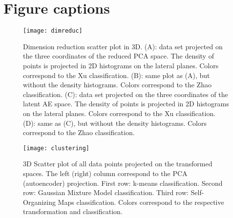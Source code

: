 \documentclass[utf8]{frontiersSCNS} %
\begin{document}
\section*{Figure captions}



\begin{figure}[h!]
	\begin{center}
		\texttt{[image: dimreduc]}%
	\end{center}
	\caption{Dimension reduction scatter plot in 3D. (A): data set projected on the three coordinates of the reduced PCA space. The density of points is projected in 2D histograms on the lateral planes. Colors correspond to the Xu classification. (B): same plot as (A), but without the density histograms. Colors correspond to the Zhao classification. (C): data set projected on the three coordinates of the latent AE space. The density of points is projected in 2D histograms on the lateral planes. Colors correspond to the Xu classification. (D): same as (C), but without the density histograms. Colors correspond to the Zhao classification. }\label{fig:dimreduc}
\end{figure}

\begin{figure}[h!]
	\begin{center}
		\texttt{[image: clustering]}%
	\end{center}
	\caption{3D Scatter plot of all data points projected on the transformed spaces. The left (right) column correspond to the PCA (autoencoder) projection. First row: k-means classification. Second row: Gaussian Mixture Model classification. Third row: Self-Organizing Maps classification. Colors correspond to the respective transformation and classification.}\label{fig:clustering}
\end{figure}
\end{document}
